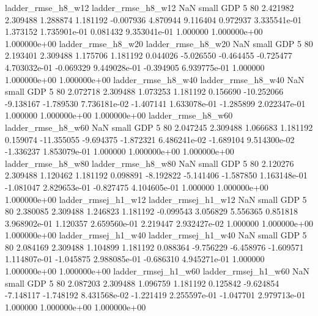       ladder_rmse_h8_w12       ladder_rmse_h8_w12                   NaN      small      GDP                 5 80 2.421982       2.309488 1.288874       1.181192   -0.007936      4.870944      9.116404     0.972937   3.335541e-01  1.373152 1.735901e-01     0.081432   9.353041e-01            1.000000    1.000000e+00        1.000000e+00
      ladder_rmse_h8_w20       ladder_rmse_h8_w20                   NaN      small      GDP                 5 80 2.193401       2.309488 1.175706       1.181192    0.044026     -5.026550     -0.464455    -0.725477   4.703032e-01 -0.069329 9.449028e-01    -0.394905   6.939775e-01            1.000000    1.000000e+00        1.000000e+00
      ladder_rmse_h8_w40       ladder_rmse_h8_w40                   NaN      small      GDP                 5 80 2.072718       2.309488 1.073253       1.181192    0.156690    -10.252066     -9.138167    -1.789530   7.736181e-02 -1.407141 1.633078e-01    -1.285899   2.022347e-01            1.000000    1.000000e+00        1.000000e+00
      ladder_rmse_h8_w60       ladder_rmse_h8_w60                   NaN      small      GDP                 5 80 2.047245       2.309488 1.066683       1.181192    0.159074    -11.355055     -9.694375    -1.872321   6.486241e-02 -1.689104 9.514300e-02    -1.336237   1.853079e-01            1.000000    1.000000e+00        1.000000e+00
      ladder_rmse_h8_w80       ladder_rmse_h8_w80                   NaN      small      GDP                 5 80 2.120276       2.309488 1.120462       1.181192    0.098891     -8.192822     -5.141406    -1.587850   1.163148e-01 -1.081047 2.829653e-01    -0.827475   4.104605e-01            1.000000    1.000000e+00        1.000000e+00
     ladder_rmsej_h1_w12      ladder_rmsej_h1_w12                   NaN      small      GDP                 5 80 2.380085       2.309488 1.246823       1.181192   -0.099543      3.056829      5.556365     0.851818   3.968902e-01  1.120357 2.659560e-01     2.219447   2.932427e-02            1.000000    1.000000e+00        1.000000e+00
     ladder_rmsej_h1_w40      ladder_rmsej_h1_w40                   NaN      small      GDP                 5 80 2.084169       2.309488 1.104899       1.181192    0.088364     -9.756229     -6.458976    -1.609571   1.114807e-01 -1.045875 2.988085e-01    -0.686310   4.945271e-01            1.000000    1.000000e+00        1.000000e+00
     ladder_rmsej_h1_w60      ladder_rmsej_h1_w60                   NaN      small      GDP                 5 80 2.087203       2.309488 1.096759       1.181192    0.125842     -9.624854     -7.148117    -1.748192   8.431568e-02 -1.221419 2.255597e-01    -1.047701   2.979713e-01            1.000000    1.000000e+00        1.000000e+00
